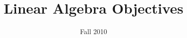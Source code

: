 \documentclass[letterpaper,oneside]{article}%
\begin{document}
\title{Linear Algebra Objectives}
\date{Fall 2010}
\maketitle




%

%
\end{document}
